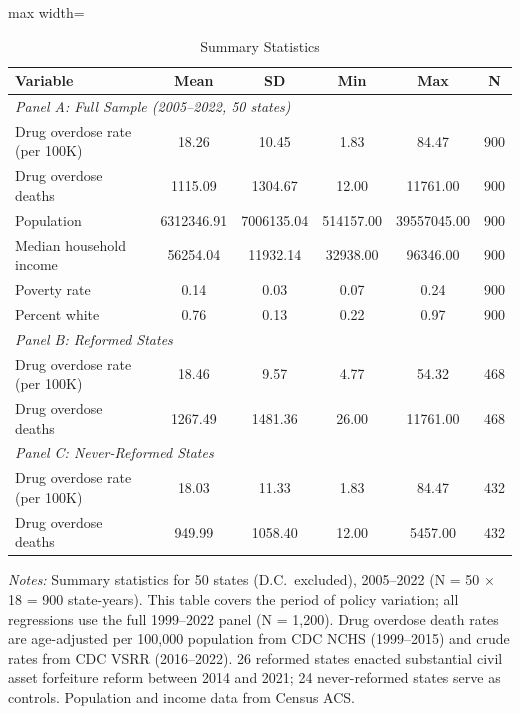 \begin{table}[H]
\centering
\caption{Summary Statistics}
\label{tab:sumstats}
\begin{adjustbox}{max width=\textwidth}
\begin{tabular}{lccccc}
\toprule
Variable & Mean & SD & Min & Max & N \\
\midrule
\multicolumn{6}{l}{\textit{Panel A: Full Sample (2005--2022, 50 states)}} \\
Drug overdose rate (per 100K) & 18.26 & 10.45 & 1.83 & 84.47 & 900 \\
Drug overdose deaths & 1115.09 & 1304.67 & 12.00 & 11761.00 & 900 \\
Population & 6312346.91 & 7006135.04 & 514157.00 & 39557045.00 & 900 \\
Median household income & 56254.04 & 11932.14 & 32938.00 & 96346.00 & 900 \\
Poverty rate & 0.14 & 0.03 & 0.07 & 0.24 & 900 \\
Percent white & 0.76 & 0.13 & 0.22 & 0.97 & 900 \\
\midrule
\multicolumn{6}{l}{\textit{Panel B: Reformed States}} \\
Drug overdose rate (per 100K) & 18.46 & 9.57 & 4.77 & 54.32 & 468 \\
Drug overdose deaths & 1267.49 & 1481.36 & 26.00 & 11761.00 & 468 \\
\midrule
\multicolumn{6}{l}{\textit{Panel C: Never-Reformed States}} \\
Drug overdose rate (per 100K) & 18.03 & 11.33 & 1.83 & 84.47 & 432 \\
Drug overdose deaths & 949.99 & 1058.40 & 12.00 & 5457.00 & 432 \\
\bottomrule
\end{tabular}
\end{adjustbox}
\begin{tablenotes}[flushleft]
\small
\item \textit{Notes:} Summary statistics for 50 states (D.C.\ excluded), 2005--2022 (N = 50 $\times$ 18 = 900 state-years). This table covers the period of policy variation; all regressions use the full 1999--2022 panel (N = 1,200). Drug overdose death rates are age-adjusted per 100,000 population from CDC NCHS (1999--2015) and crude rates from CDC VSRR (2016--2022). 26 reformed states enacted substantial civil asset forfeiture reform between 2014 and 2021; 24 never-reformed states serve as controls. Population and income data from Census ACS.
\end{tablenotes}
\end{table}
